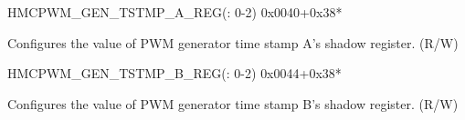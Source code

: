 \begin{register}{H}{MCPWM\_GEN\_TSTMP\_A\_REG(: 0-2)}
{0x0040+0x38*}\label{regdesc:MCPWMGENNTSTMPAREG}
%
%
\regnewline%
\begin{regdesc}\begin{reglist}
\label{fielddesc:MCPWMCMPRNA}\item [MCPWM\_CMPR\regindex{n}\_A] Configures the value of PWM generator  time stamp A's shadow register. (R/W)
\end{reglist}\end{regdesc}
\end{register}


\begin{register}{H}{MCPWM\_GEN\_TSTMP\_B\_REG(: 0-2)}
{0x0044+0x38*}\label{regdesc:MCPWMGENNTSTMPBREG}
%
%
\regnewline%
\begin{regdesc}\begin{reglist}
\label{fielddesc:MCPWMCMPRNB}\item [MCPWM\_CMPR\regindex{n}\_B] Configures the value of PWM generator  time stamp B's shadow register. (R/W)
\end{reglist}\end{regdesc}
\end{register}


